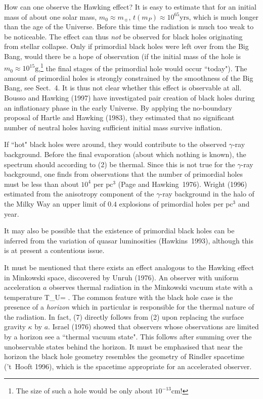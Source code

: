 How can one observe the Hawking effect? It is easy to estimate that
for an initial mass of about one solar mass, $m_0\approx m_{\sun}$,
$t(m_P)\approx 10^{65}\mbox{yrs}$, which is much longer than the
age of the Universe. Before this time the radiation is much too weak
to be noticeable.
 The effect can thus {\em not} be observed
for black holes originating from stellar collapse. Only if
primordial black holes were left over from the Big Bang,
would there be a hope of observation (if the initial mass of
the hole is $m_0\approx 10^{15}\mbox{g}$,\footnote{The size of such
a hole would be only about $10^{-13}\mbox{cm}$!}
 the final stages
of the primordial hole would occur ``today"). The amount of primordial
holes is strongly constrained by the smoothness of the Big Bang,
see Sect.~4. It is thus not clear whether this effect is observable
at all. Bousso and Hawking (1997) have investigated pair creation
of black holes during an inflationary phase in the early Universe.
By applying the no-boundary proposal of Hartle and Hawking (1983),
they estimated that no significant number of neutral holes
having sufficient initial mass survive inflation.

If ``hot" black holes were around, they would contribute to the
observed $\gamma$-ray background. Before the final evaporation
(about which nothing is known), the spectrum should
according to (2) be thermal. Since this is not true for
the $\gamma$-ray background, one finds from observations that
the number of primordial holes must be less than about $10^4$
per $\mbox{pc}^3$ (Page and Hawking~1976). Wright (1996) estimated
from the anisotropy component of the $\gamma$-ray background in the 
halo of the Milky Way an upper limit of $0.4$ explosions
of primordial holes per $\mbox{pc}^3$ and year. 

It may also be possible that the existence of primordial black holes
can be inferred from the variation of quasar luminosities
(Hawkins~1993), although this is at present a contentious issue.

\vskip 2mm
\normalsize

It must be mentioned that there exists an effect analogous to
the Hawking effect in Minkowski space, discovered by Unruh (1976).
An observer with uniform acceleration $a$ observes thermal
radiation in the Minkowski vacuum state with a temperature
\be T_U= \enspace . \ee
The common feature with the black hole case is the presence of
a {\em horizon} which in particular is responsible for the
thermal nature of the radiation. In fact, (7) directly follows from
(2) upon replacing the surface gravity $\kappa$ by $a$.
Israel (1976) showed that observers whose observations are limited
by a horizon see a ``thermal vacuum state". This follows after
summing over the unobservable states behind the horizon.
It must be emphasised that near the horizon the black hole
geometry resembles the geometry of Rindler spacetime ('t~Hooft
1996), which is the spacetime appropriate for an accelerated
observer.

